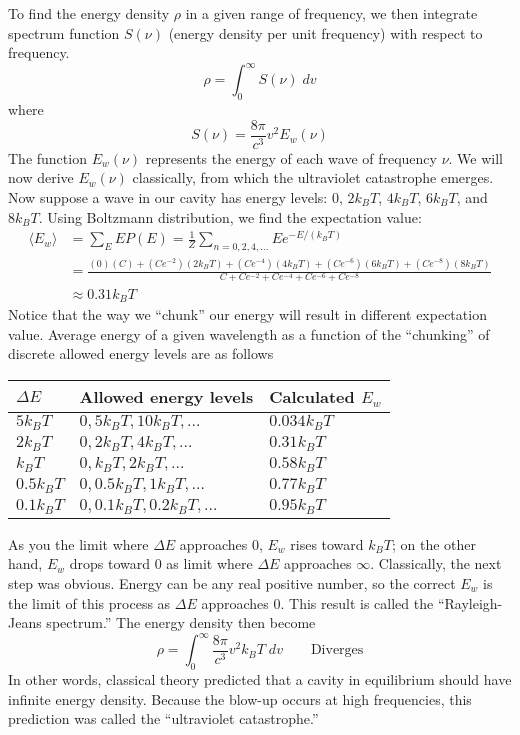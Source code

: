 \documentclass[../../../Main.tex]{subfiles}
\begin{document}
To find the energy density $\rho$ in a given range of frequency, we then integrate spectrum function $S(\nu)$ (energy density per unit frequency) with respect to frequency. 
\begin{equation*}
    \rho=\int_{0}^{\infty}S(\nu)\;dv
\end{equation*}
where
\begin{equation*}
    S(\nu)=\frac{8\pi}{c^3}v^2E_w(\nu)
\end{equation*}
The function $E_w(\nu)$ represents the energy of each wave of frequency $\nu$. We will now derive $E_w(\nu)$ classically, from which the ultraviolet catastrophe emerges. Now suppose a wave in our cavity has energy levels: $0$, $2k_B T$, $4k_B T$, $6k_B T$, and $8k_B T$. Using Boltzmann distribution, we find the expectation value:
\begin{align*}
    \langle E_w\rangle&=\sum_{E}^{}EP(E)=\frac{1}{Z}\sum_{n=0,2,4,\dots}^{}Ee^{-E/(k_BT)}\\
    &=\frac{(0)(C)+(Ce^{-2})(2k_B T)+(Ce^{-4})(4k_B T)+(Ce^{-6})(6k_B T)+(Ce^{-8})(8k_B T)}{C+Ce^{-2}+Ce^{-4}+Ce^{-6}+Ce^{-8}}\\
    &\approx 0.31k_B T
\end{align*}
Notice that the way we “chunk” our energy will result in different expectation value. Average energy of a given wavelength as a function of the “chunking” of discrete allowed energy levels are as follows
\begin{center}
    \begin{longtable}{|p{}|p{}|p{}|}
        \hline
        $\Delta E$&Allowed energy levels&Calculated $E_w$\\\hline\hline
        $5k_B T$&$0, 5k_B T, 10k_B T, \dots$&$0.034k_B T$\\
        $2k_B T$&$0, 2k_B T, 4k_B T, \dots$&$0.31k_B T$\\
        $k_B T$&$0, k_B T, 2k_B T, \dots$&$0.58k_B T$\\
        $0.5k_B T$&$0, 0.5k_B T, 1k_B T, \dots$&$0.77k_B T$\\
        $0.1k_B T$&$0, 0.1k_B T, 0.2k_B T, \dots$&$0.95k_B T$\\\hline
    \end{longtable}
\end{center}
As you the limit where $\Delta E$ approaches $0$, $E_w$ rises toward $k_B T$; on the other hand, $E_w$ drops toward $0$ as limit where $\Delta E$ approaches $\infty$. Classically, the next step was obvious. Energy can be any real positive number, so the correct $E_w$ is the limit of this process as $\Delta E$ approaches $0$. This result is called the “Rayleigh-Jeans spectrum.” The energy density then become
\begin{equation*}
    \rho=\int_{0}^{\infty}\frac{8\pi}{c^3}v^2k_B T\;dv\qquad\text{Diverges}
\end{equation*}
In other words, classical theory predicted that a cavity in equilibrium should have infinite energy density. Because the blow-up occurs at high frequencies, this prediction was called the “ultraviolet catastrophe.”
\end{document}
